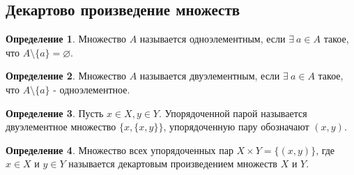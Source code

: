 \documentclass[a4paper, 12pt]{article}
\renewcommand{\emptyset}{\varnothing}
\theoremstyle{definition}
\newtheorem*{definition}{Определение}
\begin{document}
    \subsection{Декартово произведение множеств}
        \begin{definition}
            Множество $A$ называется одноэлементным, если $\exists\ a\in A$ такое, что $A\setminus\{a\} = \emptyset$.
        \end{definition}
        \begin{definition}
            Множество $A$ называется двуэлементным, если $\exists\ a\in A$ такое, что $A\setminus\{a\}$ - одноэлементное.
        \end{definition}
        \begin{definition}
            Пусть $x\in X, y\in Y$. Упорядоченной парой называется двуэлементное множество $\{x,\{x,y\}\}$, упорядоченную пару обозначают $(x,y)$.
        \end{definition}
        \begin{definition}
            Множество всех упорядоченных пар $X\times Y = \{(x,y)\}$, где \\
            $x\in X$ и $y\in Y$ называется декартовым произведением множеств $X$ и $Y$.
        \end{definition}
\end{document}
